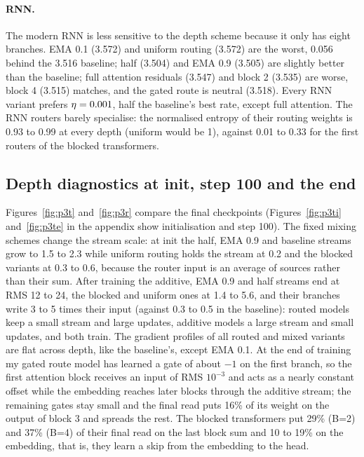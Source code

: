 \paragraph{RNN.} The modern RNN is less sensitive to the depth scheme because it only has eight branches. EMA 0.1 (3.572) and uniform routing (3.572) are the worst, 0.056 behind the 3.516 baseline; half (3.504) and EMA 0.9 (3.505) are slightly better than the baseline; full attention residuals (3.547) and block 2 (3.535) are worse, block 4 (3.515) matches, and the gated route is neutral (3.518). Every RNN variant prefers $\eta=0.001$, half the baseline's best rate, except full attention. The RNN routers barely specialise: the normalised entropy of their routing weights is 0.93 to 0.99 at every depth (uniform would be 1), against 0.01 to 0.33 for the first routers of the blocked transformers.

\subsection{Depth diagnostics at init, step 100 and the end}
Figures~\ref{fig:p3t} and~\ref{fig:p3r} compare the final checkpoints (Figures~\ref{fig:p3ti} and~\ref{fig:p3te} in the appendix show initialisation and step 100). The fixed mixing schemes change the stream scale: at init the half, EMA 0.9 and baseline streams grow to 1.5 to 2.3 while uniform routing holds the stream at 0.2 and the blocked variants at 0.3 to 0.6, because the router input is an average of sources rather than their sum. After training the additive, EMA 0.9 and half streams end at RMS 12 to 24, the blocked and uniform ones at 1.4 to 5.6, and their branches write 3 to 5 times their input (against 0.3 to 0.5 in the baseline): routed models keep a small stream and large updates, additive models a large stream and small updates, and both train. The gradient profiles of all routed and mixed variants are flat across depth, like the baseline's, except EMA 0.1. At the end of training my gated route model has learned a gate of about $-1$ on the first branch, so the first attention block receives an input of RMS $10^{-3}$ and acts as a nearly constant offset while the embedding reaches later blocks through the additive stream; the remaining gates stay small and the final read puts 16\% of its weight on the output of block 3 and spreads the rest. The blocked transformers put 29\% (B=2) and 37\% (B=4) of their final read on the last block sum and 10 to 19\% on the embedding, that is, they learn a skip from the embedding to the head.

